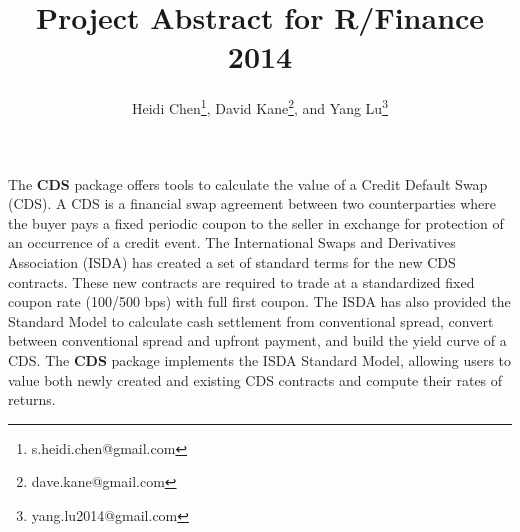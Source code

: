 \documentclass[12pt]{article}
\title{Project Abstract for R/Finance 2014}
\author{Heidi Chen\thanks{s.heidi.chen@gmail.com}, David Kane\thanks{dave.kane@gmail.com}, and Yang Lu\thanks{yang.lu2014@gmail.com}}
\theoremstyle{plain}
\begin{document}
\vspace*{-3cm}
 {\let\newpage\relax\maketitle}


The \textbf{CDS} package offers tools to calculate the value of a
Credit Default Swap (CDS). A CDS is a financial swap agreement
between two counterparties where the buyer pays a fixed periodic
coupon to the seller in exchange for protection of an occurrence of a
credit event. The International Swaps and Derivatives Association
(ISDA) has created a set of standard terms for the new CDS
contracts. These new contracts are required to trade at a standardized
fixed coupon rate (100/500 bps) with full first coupon. The ISDA has
also provided the Standard Model to calculate cash settlement from
conventional spread, convert between conventional spread and upfront
payment, and build the yield curve of a CDS. The \textbf{CDS} package
implements the ISDA Standard Model, allowing users to value both newly
created and existing CDS contracts and compute their rates of returns.
\end{document}
